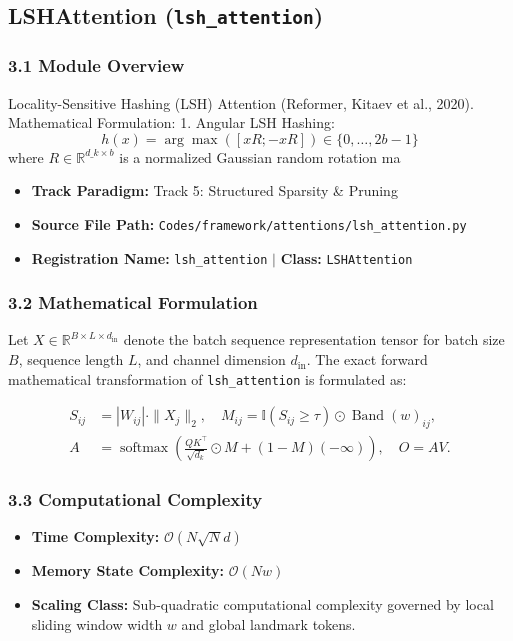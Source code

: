 \subsection{LSHAttention (\texttt{lsh\_attention})}
\label{sec:app_module_lsh\_attention}

\subsubsection*{3.1 Module Overview}
Locality-Sensitive Hashing (LSH) Attention (Reformer, Kitaev et al., 2020).  Mathematical Formulation:     1. Angular LSH Hashing:        $$h(x) = \arg\max \left( [x R; -x R] \right) \in \{0, \dots, 2b - 1\}$$        where $R \in \mathbb{R}^{d\_k \times b}$ is a normalized Gaussian random rotation ma
\begin{itemize}
    \item \textbf{Track Paradigm:} Track 5: Structured Sparsity & Pruning
    \item \textbf{Source File Path:} \texttt{Codes/framework/attentions/lsh\_attention.py}
    \item \textbf{Registration Name:} \texttt{lsh\_attention} $\mid$ \textbf{Class:} \texttt{LSHAttention}
\end{itemize}

\subsubsection*{3.2 Mathematical Formulation}
Let $X \in \mathbb{R}^{B \times L \times d_{\text{in}}}$ denote the batch sequence representation tensor for batch size $B$, sequence length $L$, and channel dimension $d_{\text{in}}$. The exact forward mathematical transformation of \texttt{lsh\_attention} is formulated as:

\begin{align}
S_{ij} &= |W_{ij}| \cdot \|X_j\|_2, \quad M_{ij} = \mathbb{I}(S_{ij} \ge \tau) \odot \operatorname{Band}(w)_{ij}, \\
A &= \operatorname{softmax}\left(\frac{Q K^\top}{\sqrt{d_k}} \odot M + (1 - M)(-\infty)\right), \quad O = A V.
\end{align}


\subsubsection*{3.3 Computational Complexity}
\begin{itemize}
    \item \textbf{Time Complexity:} $\mathcal{O}(N \sqrt{N} d)$
    \item \textbf{Memory State Complexity:} $\mathcal{O}(N w)$
    \item \textbf{Scaling Class:} Sub-quadratic computational complexity governed by local sliding window width $w$ and global landmark tokens.
\end{itemize}

